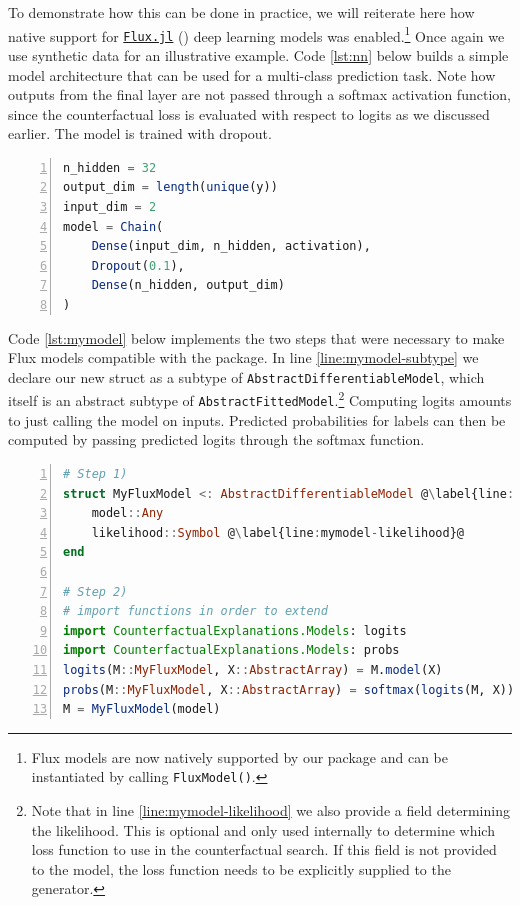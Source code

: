 \documentclass[
  letterpaper,
  DIV=11,
  numbers=noendperiod]{scrartcl}
\begin{document}
To demonstrate how this can be done in practice, we will reiterate here
how native support for \href{https://fluxml.ai/}{\texttt{Flux.jl}}
(\cite{innes2018flux}) deep learning models was enabled.\footnote{Flux
  models are now natively supported by our package and can be
  instantiated by calling \texttt{FluxModel()}.} Once again we use
synthetic data for an illustrative example. Code \ref{lst:nn} below
builds a simple model architecture that can be used for a multi-class
prediction task. Note how outputs from the final layer are not passed
through a softmax activation function, since the counterfactual loss is
evaluated with respect to logits as we discussed earlier. The model is
trained with dropout.

\begin{lstlisting}[language=Julia, escapechar=@, numbers=left, label={lst:nn}, caption={A simple neural network model.}]
n_hidden = 32
output_dim = length(unique(y))
input_dim = 2
model = Chain(
    Dense(input_dim, n_hidden, activation),
    Dropout(0.1),
    Dense(n_hidden, output_dim)
)  
\end{lstlisting}

Code \ref{lst:mymodel} below implements the two steps that were
necessary to make Flux models compatible with the package. In line
\ref{line:mymodel-subtype} we declare our new struct as a subtype of
\texttt{AbstractDifferentiableModel}, which itself is an abstract
subtype of \texttt{AbstractFittedModel}.\footnote{Note that in line
  \ref{line:mymodel-likelihood} we also provide a field determining the
  likelihood. This is optional and only used internally to determine
  which loss function to use in the counterfactual search. If this field
  is not provided to the model, the loss function needs to be explicitly
  supplied to the generator.} Computing logits amounts to just calling
the model on inputs. Predicted probabilities for labels can then be
computed by passing predicted logits through the softmax function.

\begin{lstlisting}[language=Julia, escapechar=@, numbers=left, label={lst:mymodel}, caption={A wrapper for Flux models.}]
# Step 1)
struct MyFluxModel <: AbstractDifferentiableModel @\label{line:mymodel-subtype}@
    model::Any
    likelihood::Symbol @\label{line:mymodel-likelihood}@
end

# Step 2)
# import functions in order to extend
import CounterfactualExplanations.Models: logits
import CounterfactualExplanations.Models: probs 
logits(M::MyFluxModel, X::AbstractArray) = M.model(X)
probs(M::MyFluxModel, X::AbstractArray) = softmax(logits(M, X))
M = MyFluxModel(model)
\end{lstlisting}
\end{document}
